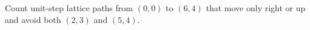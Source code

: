 Count unit-step lattice paths from $(0,0)$ to $(6,4)$ that move only right or up and avoid both $(2,3)$ and $(5,4)$.
